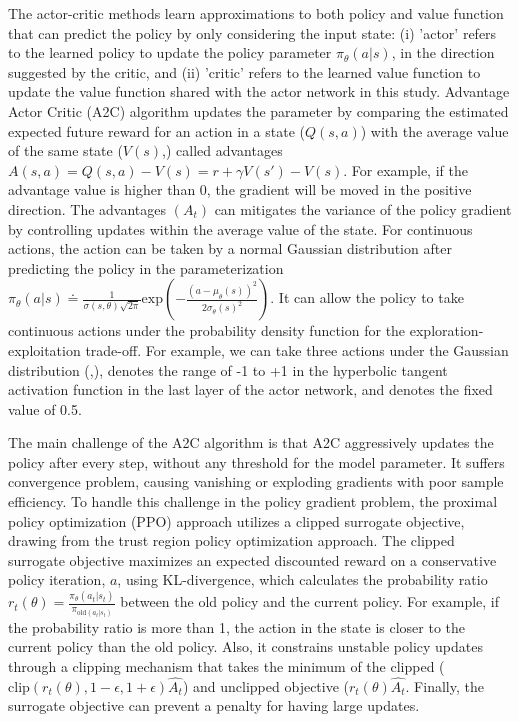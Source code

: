 \documentclass[preprint,12pt]{elsarticle}
\begin{document}
The actor-critic methods learn approximations to both policy and value function that can predict the policy by only considering the input state: (i) 'actor' refers to the learned policy to update the policy parameter $\pi_\theta(a|s)$, in the direction suggested by the critic, and (ii) 'critic' refers to the learned value function to update the value function shared with the actor network in this study. Advantage Actor Critic (A2C) algorithm updates the parameter by comparing the estimated expected future reward for an action in a state ($Q(s,a)$) with the average value of the same state ($V(s)$,) called advantages $A(s,a)=Q(s,a) - V(s)=r+\gamma V(s')-V(s)$. For example, if the advantage value is higher than 0, the gradient will be moved in the positive direction. The advantages $(A_t)$ can mitigates the variance of the policy gradient by controlling updates within the average value of the state. For continuous actions, the action can be taken by a normal Gaussian distribution after predicting the policy in the parameterization $\pi_\theta(a|s)\doteq \frac{1}{\sigma(s,\theta)\sqrt{2\pi}}\mathrm{exp}(-\frac{(a-\mu_\theta(s))^2}{2\sigma_\theta(s)^2})$. It can allow the policy to take continuous actions under the probability density function for the exploration-exploitation trade-off. For example, we can take three actions under the Gaussian distribution (\mu,\sigma), \mu denotes the range of -1 to +1 in the hyperbolic tangent activation function in the last layer of the actor network, and \sigma denotes the fixed value of 0.5. 

The main challenge of the A2C algorithm is that A2C aggressively updates the policy after every step, without any threshold for the model parameter. It suffers convergence problem, causing vanishing or exploding gradients with poor sample efficiency. To handle this challenge in the policy gradient problem, the proximal policy optimization (PPO) approach utilizes a clipped surrogate objective, drawing from the trust region policy optimization approach. The clipped surrogate objective maximizes an expected discounted reward on a conservative policy iteration, $a$, using KL-divergence, which calculates the probability ratio $r_t(\theta)=\frac{\pi_\theta(a_t|s_t)}{\pi_{\mathrm{old}(a_t|s_t)}}$ between the old policy and the current policy. For example, if the probability ratio is more than 1, the action in the state is closer to the current policy than the old policy. Also, it constrains unstable policy updates through a clipping mechanism that takes the minimum of the clipped ($\mathrm{clip}(r_t(\theta), 1-\epsilon, 1+\epsilon)\hat{A_t}$) and unclipped objective ($r_t(\theta)\hat{A_t}$. Finally, the surrogate objective can prevent a penalty for having large updates. 
\end{document}
